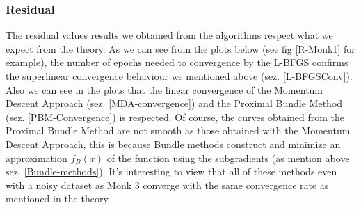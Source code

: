 \subsubsection{Residual}
The residual values results we obtained from the algorithms respect what we expect from the theory.  As we can see from the plots below (see fig \ref{R-Monk1} for example), the number of epochs needed to convergence by the L-BFGS confirms the superlinear convergence behaviour we mentioned above (sez. \ref{L-BFGSConv}).  Also we can see in the plots that the linear convergence of the Momentum Descent Approach (sez.  \ref{MDA-convergence}) and the Proximal Bundle Method (sez. \ref{PBM-Convergence}) is respected. Of course, the curves obtained from the Proximal Bundle Method are not smooth as those obtained with the Momentum Descent Approach, this is because Bundle methods construct and minimize an approximation $f_B(x)$ of the function using the subgradients (as mention above sez. \ref{Bundle-methods}).  It's interesting to view that all of these methods even with a noisy dataset as Monk 3 converge with the same convergence rate as mentioned in the theory.

